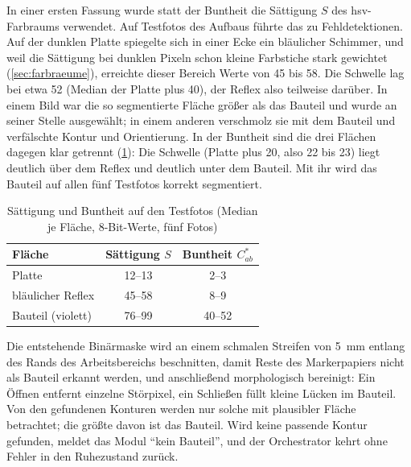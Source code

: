 In einer ersten Fassung wurde statt der Buntheit die Sättigung $S$ des \ac{hsv}-Farbraums
verwendet. Auf Testfotos des Aufbaus führte das zu Fehldetektionen. Auf der dunklen Platte
spiegelte sich in einer Ecke ein bläulicher Schimmer, und weil die Sättigung bei dunklen
Pixeln schon kleine Farbstiche stark gewichtet (\cref{sec:farbraeume}), erreichte dieser
Bereich Werte von 45 bis 58. Die Schwelle lag bei etwa 52 (Median der Platte plus 40), der
Reflex also teilweise darüber. In einem Bild war die so segmentierte Fläche größer als das
Bauteil und wurde an seiner Stelle ausgewählt; in einem anderen verschmolz sie mit dem
Bauteil und verfälschte Kontur und Orientierung. In der Buntheit sind die drei Flächen
dagegen klar getrennt (\cref{tab:m1-buntheit}): Die Schwelle (Platte plus 20, also 22 bis
23) liegt deutlich über dem Reflex und deutlich unter dem Bauteil. Mit ihr wird das Bauteil auf allen fünf
Testfotos korrekt segmentiert.

\begin{table}[htbp]
  \centering
  \caption{Sättigung und Buntheit auf den Testfotos (Median je Fläche, 8-Bit-Werte, fünf
  Fotos)}
  \label{tab:m1-buntheit}
  \begin{tabular}{@{}lcc@{}}
    \toprule
    Fläche & Sättigung $S$ & Buntheit $C^*_{ab}$ \\
    \midrule
    Platte              & 12--13 & 2--3 \\
    bläulicher Reflex   & 45--58 & 8--9 \\
    Bauteil (violett)   & 76--99 & 40--52 \\
    \bottomrule
  \end{tabular}
\end{table}

Die entstehende Binärmaske wird an einem schmalen Streifen von \SI{5}{\milli\metre} entlang
des Rands des Arbeitsbereichs beschnitten, damit Reste des Markerpapiers nicht als Bauteil
erkannt werden, und anschließend morphologisch bereinigt: Ein Öffnen
entfernt einzelne Störpixel, ein Schließen füllt kleine Lücken im Bauteil. Von den
gefundenen Konturen werden nur solche mit plausibler Fläche betrachtet; die größte davon
ist das Bauteil. Wird keine passende Kontur gefunden, meldet das Modul \enquote{kein Bauteil},
und der Orchestrator kehrt ohne Fehler in den Ruhezustand zurück.

